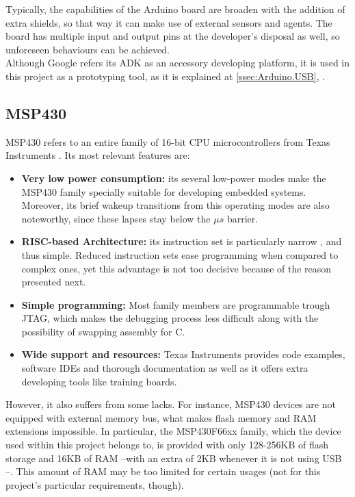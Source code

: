 			Typically, the capabilities of the Arduino board are broaden with the addition of extra shields,
			so that way it can make use of external sensors and agents. The board has multiple input and
			output pins at the developer's disposal as well, so unforeseen behaviours can be achieved.\\
			
			Although Google refers its ADK as an accessory developing platform, it is used in this project
			as a prototyping tool, as it is explained at \autoref{ssec:Arduino.USB}, .
			
		\subsection{MSP430}
		\label{ssec:msp430}
			MSP430 refers to an entire family of 16-bit CPU microcontrollers from Texas Instruments \cite{msp430}.
			Its most relevant features are:
			\begin{itemize}
				\item \textbf{Very low power consumption:} its several low-power modes make the MSP430 
					family specially suitable for developing embedded systems. Moreover, its brief wakeup 
					transitions from this operating modes are also noteworthy, since these lapses stay 
					below the $\mu s$ barrier.
				\item \textbf{RISC-based Architecture:} its instruction set is particularly narrow \cite{msp430iss}, 
					and thus simple. Reduced instruction sets ease programming when compared to complex ones,
					yet this advantage is not too decisive because of the reason presented next.
				\item \textbf{Simple programming:} Most family members are programmable trough JTAG, which
					makes the debugging process less difficult along with the possibility of swapping
					assembly for C.
				\item \textbf{Wide support and resources:} Texas Instruments provides code examples, software 
					IDEs and thorough documentation as well as it offers extra developing tools like training 
					boards.
			\end{itemize}
			However, it also suffers from some lacks. For instance, MSP430 devices are not equipped with
			external memory bus, what makes flash memory and RAM extensions impossible. In particular, the
			MSP430F66xx family, which the device used within this project belongs to, is provided with only 
			128-256KB of flash storage and 16KB	of RAM --with an extra of 2KB whenever it is not using USB 
			\cite[p. 2]{msp430f6638ds}--. This amount of RAM may be too limited for certain usages (not for 
			this project's particular requirements, though).
		
